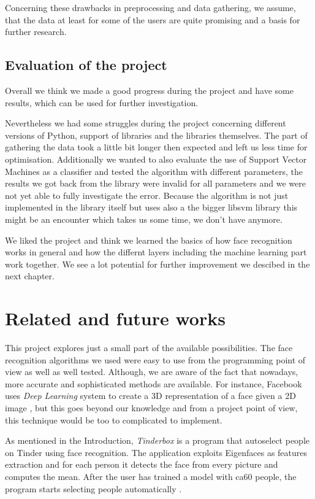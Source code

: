 \documentclass{report}
\begin{document}
Concerning these drawbacks in preprocessing and data gathering, we assume, that the data at least for some of the users are quite promising and a basis for further research.

\section{Evaluation of the project}
Overall we think we made a good progress during the project and have some results, which can be used for further investigation.

Nevertheless we had some struggles during the project concerning different versions of Python, support of libraries and the libraries themselves.
The part of gathering the data took a little bit longer then expected and left us less time for optimisation.
Additionally we wanted to also evaluate the use of Support Vector Machines as a classifier and tested the algorithm with different parameters, the results we got back from the library were invalid for all parameters and we were not yet able to fully investigate the error.
Because the algorithm is not just implemented in the library itself but uses also a the bigger libsvm library this might be an encounter which takes us some time, we don't have anymore.

We liked the project and think we learned the basics of how face recognition works in general and how the differnt layers including the machine learning part work together.
We see a lot potential for further improvement we descibed in the next chapter.

\chapter{Related and future works}
This project explores just a small part of the available possibilities. The face recognition algorithms we used were easy to use from the programming point of view as well as well tested. Although, we are aware of the fact that nowadays, more accurate and sophisticated methods are available. For instance, Facebook uses \textit{Deep Learning} system to create a 3D representation of a face given a 2D image \cite{taigman2014deepface}, but this goes beyond our knowledge and from a project point of view, this technique would be too to complicated to implement.

As mentioned in the Introduction, \textit{Tinderbox} is a program that autoselect people on Tinder using face recognition. The application exploits Eigenfaces as features extraction and for each person it detects the face from every picture and computes the mean. After the user has trained a model with ca60 people, the program starts selecting people automatically \cite{tinderbox}.
\end{document}

